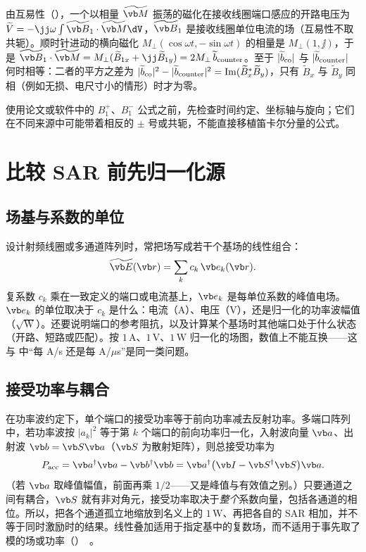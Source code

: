 \begin{deeper}[为什么接收看反向分量]
由互易性（），一个以相量 $\widetilde{\vb M}$ 振荡的磁化在接收线圈端口感应的开路电压为 $\widetilde V=-\jj\omega\int\widetilde{\vb B}_1\cdot\widetilde{\vb M}\dV$，$\widetilde{\vb B}_1$ 是接收线圈单位电流的场（互易性不取共轭）。顺时针进动的横向磁化 $M_\perp(\cos\omega t,-\sin\omega t)$ 的相量是 $M_\perp(1,\jj)$，于是 $\widetilde{\vb B}_1\cdot\widetilde{\vb M}=M_\perp(\widetilde B_{1x}+\jj\widetilde B_{1y})=2M_\perp\,\widetilde b_{\rm counter}$。至于 $|\widetilde b_{\rm co}|$ 与 $|\widetilde b_{\rm counter}|$ 何时相等：二者的平方之差为 $|\widetilde b_{\rm co}|^2-|\widetilde b_{\rm counter}|^2=\operatorname{Im}(\widetilde B_x^*\widetilde B_y)$，只有 $\widetilde B_x$ 与 $\widetilde B_y$ 同相（例如无损、电尺寸小的情形）时才为零。
\end{deeper}

使用论文或软件中的 $B_1^+$、$B_1^-$ 公式之前，先检查时间约定、坐标轴与旋向；它们在不同来源中可能带着相反的 $\pm$ 号或共轭，不能直接移植笛卡尔分量的公式。

\section{比较 SAR 前先归一化源}\label{sec:rf-normalization}

\subsection{场基与系数的单位}
设计射频线圈或多通道阵列时，常把场写成若干个基场的线性组合：
\begin{equation}
\widetilde{\vb E}(\vb r)=\sum_kc_k\,\vb e_k(\vb r).
\label{eq:rf-basis}
\end{equation}
复系数 $c_k$ 乘在一致定义的端口或电流基上，$\vb e_k$ 是每单位系数的峰值电场。$\vb e_k$ 的单位取决于 $c_k$ 是什么：电流（A）、电压（V），还是归一化的功率波幅值（$\sqrt{\mathrm W}$）。还要说明端口的参考阻抗，以及计算某个基场时其他端口处于什么状态（开路、短路或匹配）。按 $1\,\mathrm A$、$1\,\mathrm V$、$1\,\mathrm W$ 归一化的场图，数值上不能互换——这与 中“每 A/s 还是每 A/$\mu$s”是同一类问题。

\subsection{接受功率与耦合}
在功率波约定下，单个端口的接受功率等于前向功率减去反射功率。多端口阵列中，若功率波按 $|a_k|^2$ 等于第 $k$ 个端口的前向功率归一化，入射波向量 $\vb a$、出射波 $\vb b=\vb S\vb a$（$\vb S$ 为散射矩阵），则总接受功率为
\begin{equation}
P_{\rm acc}=\vb a^{\dagger}\vb a-\vb b^{\dagger}\vb b=\vb a^{\dagger}\bigl(\vb I-\vb S^{\dagger}\vb S\bigr)\vb a .
\end{equation}
（若 $\vb a$ 取峰值幅值，前面再乘 $1/2$——又是峰值与有效值之别。）只要通道之间有耦合，$\vb S$ 就有非对角元，接受功率取决于\emph{整个}系数向量，包括各通道的相位。所以，把各个通道孤立地缩放到名义上的 $1\,\mathrm W$、再把各自的 SAR 相加，并不等于同时激励时的结果。线性叠加适用于指定基中的复数场，而不适用于事先取了模的场或功率（）~\cite{rf}。

